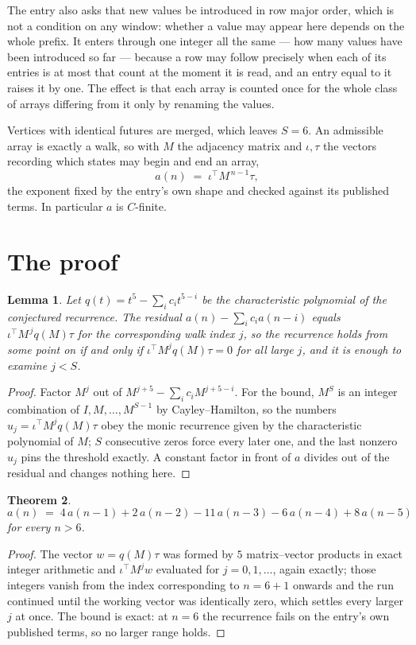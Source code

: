 \documentclass[11pt,a4paper]{article}
\theoremstyle{plain}
\newtheorem{theorem}{Theorem}
\newtheorem{lemma}[theorem]{Lemma}
\theoremstyle{definition}
\begin{document}
The entry also asks that new values be introduced in row major order, which is not a condition on any window: whether a value may appear here depends on the whole prefix. It enters through one integer all the same --- how many values have been introduced so far --- because a row may follow precisely when each of its entries is at most that count at the moment it is read, and an entry equal to it raises it by one. The effect is that each array is counted once for the whole class of arrays differing from it only by renaming the values.

Vertices with identical futures are merged, which leaves $S=6$. An admissible array is exactly a walk, so with $M$ the adjacency matrix and $\iota,\tau$ the vectors recording which states may begin and end an array,
\[
a(n)\;=\;\iota^{\!\top}M^{\,n-1}\tau ,
\]
the exponent fixed by the entry's own shape and checked against its published terms. In
particular $a$ is $C$-finite.

\section{The proof}

\begin{lemma}\label{lem:crit}
Let $q(t)=t^{5}-\sum_i c_it^{5-i}$ be the characteristic polynomial of the
conjectured recurrence. The residual $a(n)-\sum_ic_ia(n-i)$ equals
$\iota^{\!\top}M^{\,j}q(M)\tau$ for the corresponding walk index $j$, so the recurrence
holds from some point on if and only if $\iota^{\!\top}M^{j}q(M)\tau=0$ for all large $j$,
and it is enough to examine $j<S$.
\end{lemma}

\begin{proof}
Factor $M^{j}$ out of $M^{j+5}-\sum_ic_iM^{j+5-i}$. For the bound, $M^{S}$
is an integer combination of $I,M,\dots,M^{S-1}$ by Cayley--Hamilton, so the numbers
$u_j=\iota^{\!\top}M^{j}q(M)\tau$ obey the monic recurrence given by the characteristic
polynomial of $M$; $S$ consecutive zeros force every later one, and the last nonzero $u_j$
pins the threshold exactly. A constant factor in front of $a$ divides out of the residual and
changes nothing here.
\end{proof}

\begin{theorem}
\[
a(n)\;=\;4\,a(n-1) + 2\,a(n-2) - 11\,a(n-3) - 6\,a(n-4) + 8\,a(n-5)
\]
for every $n>6$.
\end{theorem}

\begin{proof}
The vector $w=q(M)\tau$ was formed by $5$ matrix--vector products in exact integer
arithmetic and $\iota^{\!\top}M^{j}w$ evaluated for $j=0,1,\dots$, again exactly; those
integers vanish from the index corresponding to $n=6+1$ onwards and the run continued
until the working vector was identically zero, which settles every larger $j$ at once. The bound is exact: at $n=6$ the recurrence fails on the entry's own published terms, so no larger range holds.
\end{proof}
\end{document}
